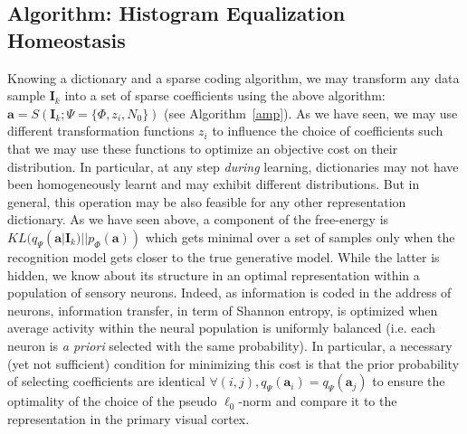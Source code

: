 \documentclass[draft]{article} %
\newcommand{\coef}{\mathbf{a}} %
\newcommand{\image}{\mathbf{I}} %
\newcommand{\dico}{\Phi} %
\begin{document}
\subsection{Algorithm: Histogram Equalization Homeostasis}\label{HEH}
Knowing a dictionary and a sparse coding algorithm, we may transform any data sample $\image_k$ into a set of sparse coefficients using the above algorithm: $\coef = S(\image_k; \Psi=\{\dico, z_i, N_0\})$ (see Algorithm~\ref{amp}). As we have seen, we may use different transformation functions $z_i$ to influence the choice of coefficients such that we may use these functions to optimize an objective cost on their distribution. In particular, at any step \emph{during} learning, dictionaries may not have been homogeneously learnt and may exhibit different distributions. But in general, this operation may be also feasible for any other representation dictionary. As we have seen above, a component of the free-energy is $KL( q_\Psi(\coef | \image_k) || p_\dico(\coef) )$ which gets minimal over a set of samples only when the recognition model gets closer to the true generative model. While the latter is hidden, we know about its structure in an optimal representation within a population of sensory neurons. Indeed, as information is coded in the address of neurons, information transfer, in term of Shannon entropy, is optimized when average activity within the neural population is uniformly balanced (i.e. each neuron is \emph{a priori} selected with the same probability). In particular, a necessary (yet not sufficient) condition for minimizing this cost is that the prior probability of selecting coefficients are identical $\forall (i,j), q_\Psi(\coef_i)=q_\Psi(\coef_j)$ to ensure the optimality of the choice of the pseudo $\ell_0$-norm and compare it to the representation in the primary visual cortex.
\end{document}
